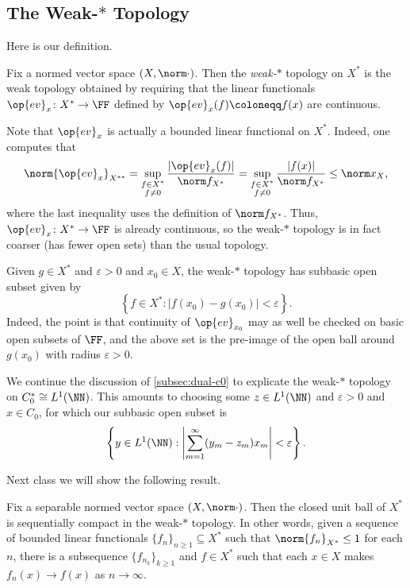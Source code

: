 \documentclass[../notes.tex]{subfiles}
\begin{document}
\subsection{The Weak-\texorpdfstring{$*$}{*} Topology}
Here is our definition.
\begin{definition}
	Fix a normed vector space $(X,\norm\cdot)$. Then the \textit{weak-$*$} topology on $X^*$ is the weak topology obtained by requiring that the linear functionals $\op{ev}_x\colon X^*\to\FF$ defined by $\op{ev}_x(f)\coloneqq f(x)$ are continuous.
\end{definition}
\begin{remark}
	Note that $\op{ev}_x$ is actually a bounded linear functional on $X^*$. Indeed, one computes that
	\[\norm{\op{ev}_x}_{X^{**}}=\sup_{\substack{f\in X^*\\f\ne0}}\frac{\left|\op{ev}_x(f)\right|}{\norm f_{X^*}}=\sup_{\substack{f\in X^*\\f\ne0}}\frac{\left|f(x)\right|}{\norm f_{X^*}}\le\norm x_X,\]
	where the last inequality uses the definition of $\norm f_{X^*}$. Thus, $\op{ev}_x\colon X^*\to\FF$ is already continuous, so the weak-$*$ topology is in fact coarser (has fewer open sets) than the usual topology.
\end{remark}
\begin{example}
	Given $g\in X^*$ and $\varepsilon>0$ and $x_0\in X$, the weak-$*$ topology has subbasic open subset given by
	\[\left\{f\in X^*:\left|f(x_0)-g(x_0)\right|<\varepsilon\right\}.\]
	Indeed, the point is that continuity of $\op{ev}_{x_0}$ may as well be checked on basic open subsets of $\FF$, and the above set is the pre-image of the open ball around $g(x_0)$ with radius $\varepsilon>0$.
\end{example}
\begin{example}
	We continue the discussion of \cref{subsec:dual-c0} to explicate the weak-$*$ topology on $C_0^*\cong L^1(\NN)$. This amounts to choosing some $z\in L^1(\NN)$ and $\varepsilon>0$ and $x\in C_0$, for which our subbasic open subset is
	\[\left\{y\in L^1(\NN):\left|\sum_{m=1}^\infty(y_m-z_m)x_m\right|<\varepsilon\right\}.\]
\end{example}
Next class we will show the following result.
\begin{theorem}[Helly]
	Fix a separable normed vector space $(X,\norm\cdot)$. Then the closed unit ball of $X^*$ is sequentially compact in the weak-$*$ topology. In other words, given a sequence of bounded linear functionals $\{f_n\}_{n\ge1}\subseteq X^*$ such that $\norm{f_n}_{X^*}\le1$ for each $n$, there is a subsequence $\{f_{n_k}\}_{k\ge1}$ and $f\in X^*$ such that each $x\in X$ makes $f_n(x)\to f(x)$ as $n\to\infty$.
\end{theorem}
\end{document}
